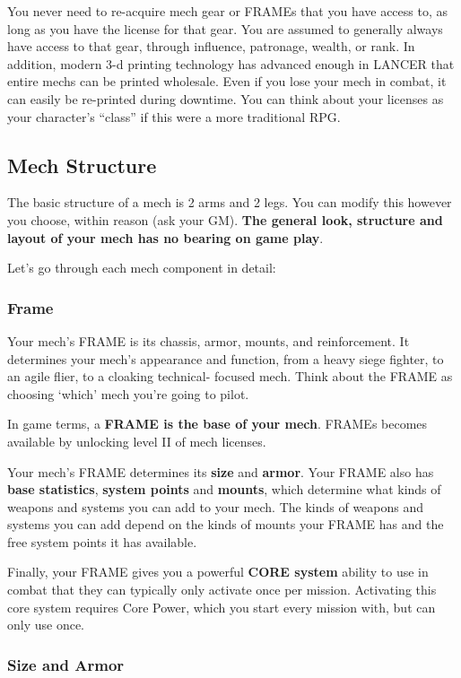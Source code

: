 You never need to re-acquire mech gear or FRAMEs that you have access to, as long as you have the license for that gear. You are assumed to generally always have access to that gear, through influence, patronage, wealth, or rank. In addition, modern 3-d printing technology has advanced enough in LANCER that entire mechs can be printed wholesale. Even if you lose your mech in combat, it can easily be re-printed during downtime. You can think about your licenses as your character's ``class'' if this were a more traditional RPG.

\subsection{Mech Structure}

The basic structure of a mech is 2 arms and 2 legs. You can modify this however you choose, within reason (ask your GM). \textbf{The general look, structure and layout of your mech has no bearing on game play}. 

Let's go through each mech component in detail:
\subsubsection{Frame}

Your mech's FRAME is its chassis, armor, mounts, and reinforcement. It determines your mech's appearance and function, from a heavy siege fighter, to an agile flier, to a cloaking technical- focused mech. Think about the FRAME as choosing `which' mech you're going to pilot. 

In game terms, a \textbf{FRAME is the base of your mech}. FRAMEs becomes available by unlocking level II of mech licenses. 

Your mech's FRAME determines its \textbf{size} and \textbf{armor}. Your FRAME also has \textbf{base statistics}, \textbf{system points} and \textbf{mounts}, which determine what kinds of weapons and systems you can add to your mech. The kinds of weapons and systems you can add depend on the kinds of mounts your FRAME has and the free system points it has available. 

Finally, your FRAME gives you a powerful \textbf{CORE system} ability to use in combat that they can typically only activate once per mission. Activating this core system requires Core Power, which you start every mission with, but can only use once.

\subsubsection{Size and Armor}

